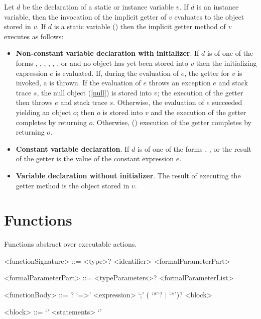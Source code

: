 \documentclass[makeidx]{article}
\begin{document}
\LMHash{}%
Let $d$ be the declaration of a static or instance variable $v$.
If $d$ is an instance variable,
then the invocation of the implicit getter of $v$ evaluates to
the object stored in $v$.
If $d$ is a static variable
()
then the implicit getter method of $v$ executes as follows:
\begin{itemize}
\item {\bf Non-constant variable declaration with initializer}.
If $d$ is of one of the forms
,
,
,
,
,
,
 or
and no object has yet been stored into $v$
then the initializing expression $e$ is evaluated.
If, during the evaluation of $e$, the getter for $v$ is invoked,
a  is thrown.
If the evaluation of $e$ throws an exception $e$ and stack trace $s$,
the null object (\ref{null}) is stored into $v$;
the execution of the getter then throws $e$ and stack trace $s$.
Otherwise, the evaluation of $e$ succeeded yielding an object $o$;
then $o$ is stored into $v$ and
the execution of the getter completes by returning $o$.
Otherwise,
()
execution of the getter completes by returning $o$.
\item {\bf Constant variable declaration}.
If $d$ is of one of the forms
,
,
 or
the result of the getter is the value of the constant expression $e$.
\item {\bf Variable declaration without initializer}.
The result of executing the getter method is the object stored in $v$.
\end{itemize}


\section{Functions}

\LMHash{}%
Functions abstract over executable actions.

\begin{grammar}
<functionSignature> ::= \gnewline{}
  <type>? <identifier> <formalParameterPart>

<formalParameterPart> ::= <typeParameters>? <formalParameterList>

<functionBody> ::= \ASYNC{}? `=>' <expression> `;'
  \alt (\ASYNC{} `*'? | \SYNC{} `*')? <block>

<block> ::= `{' <statements> `}'
\end{grammar}
\end{document}
